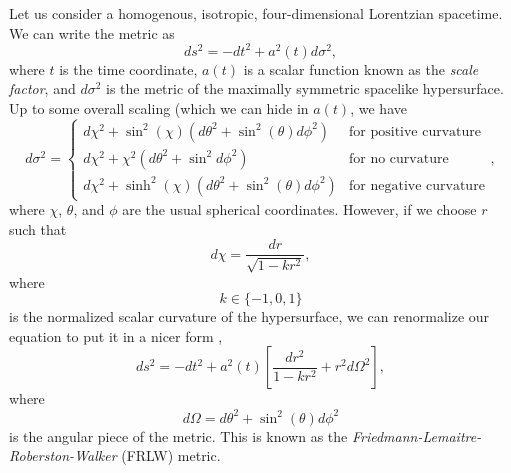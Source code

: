 \documentclass[]{article}
\begin{document}
Let us consider a homogenous, isotropic, four-dimensional Lorentzian
spacetime. We can write the metric as \cite{Carroll}
\begin{equation}
  \label{eq:hom:iso:most:general}
  ds^2 = -dt^2 + a^2(t) d\sigma^2,
\end{equation}
where $t$ is the time coordinate, $a(t)$ is a scalar function known as
the \textit{scale factor}, and $d\sigma^2$ is the metric of the
maximally symmetric spacelike hypersurface. Up to some overall scaling
(which we can hide in $a(t)$, we have \cite{Wald}
\begin{equation}
  \label{eq:3-metric}
  d\sigma^2 = \begin{cases}
    d\chi^2 + \sin^2(\chi)(d\theta^2 + \sin^2(\theta)d\phi^2)&\text{for positive curvature}\\
    d\chi^2 + \chi^2(d\theta^2 + \sin^2d\phi^2)&\text{for no curvature}\\
    d\chi^2 + \sinh^2(\chi)(d\theta^2 + \sin^2(\theta)d\phi^2)&\text{for negative curvature}
    \end{cases},
\end{equation}
where $\chi$, $\theta$, and $\phi$ are the usual spherical
coordinates. However, if we choose $r$ such that
\begin{equation}
  \label{eq:def:rho}
  d\chi = \frac{dr}{\sqrt{1 - k r^2}},
\end{equation}
where
\begin{equation}
  \label{eq:k:range}
  k\in\{-1,0,1\}
\end{equation}
is the normalized scalar curvature of the hypersurface, we can
renormalize our equation to put it in a nicer form
\cite{Carroll,MisnerThorneWheeler},
\begin{equation}
  \label{eq:friedmann:equation}
  ds^2 = -dt^2 + a^2(t)\left[\frac{dr^2}{1 - k r^2} + r^2 d\Omega^2\right],
\end{equation}
where
\begin{equation}
  \label{eq:def:domega}
  d\Omega = d\theta^2 + \sin^2(\theta) d\phi^2
\end{equation}
is the angular piece of the metric. This is known as the
\textit{Friedmann-Lemaitre-Roberston-Walker} (FRLW) metric.
\end{document}
